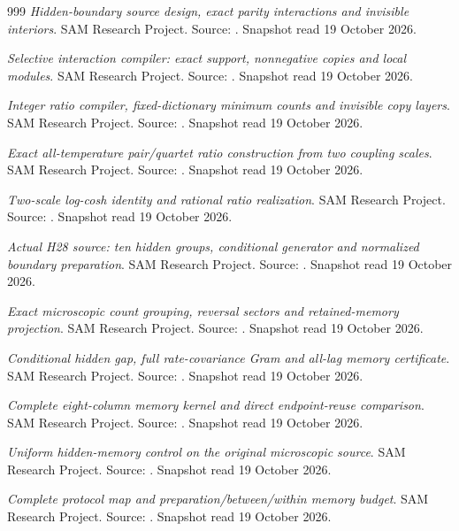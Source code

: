 \begin{thebibliography}{999}
 \emph{Hidden-boundary source design, exact parity interactions and invisible interiors}. SAM Research Project. Source: . Snapshot read 19 October 2026.

 \emph{Selective interaction compiler: exact support, nonnegative copies and local modules}. SAM Research Project. Source: . Snapshot read 19 October 2026.

 \emph{Integer ratio compiler, fixed-dictionary minimum counts and invisible copy layers}. SAM Research Project. Source: . Snapshot read 19 October 2026.

 \emph{Exact all-temperature pair/quartet ratio construction from two coupling scales}. SAM Research Project. Source: . Snapshot read 19 October 2026.

 \emph{Two-scale log-cosh identity and rational ratio realization}. SAM Research Project. Source: . Snapshot read 19 October 2026.

 \emph{Actual H28 source: ten hidden groups, conditional generator and normalized boundary preparation}. SAM Research Project. Source: . Snapshot read 19 October 2026.

 \emph{Exact microscopic count grouping, reversal sectors and retained-memory projection}. SAM Research Project. Source: . Snapshot read 19 October 2026.

 \emph{Conditional hidden gap, full rate-covariance Gram and all-lag memory certificate}. SAM Research Project. Source: . Snapshot read 19 October 2026.

 \emph{Complete eight-column memory kernel and direct endpoint-reuse comparison}. SAM Research Project. Source: . Snapshot read 19 October 2026.

 \emph{Uniform hidden-memory control on the original microscopic source}. SAM Research Project. Source: . Snapshot read 19 October 2026.

 \emph{Complete protocol map and preparation/between/within memory budget}. SAM Research Project. Source: . Snapshot read 19 October 2026.


\end{thebibliography}
